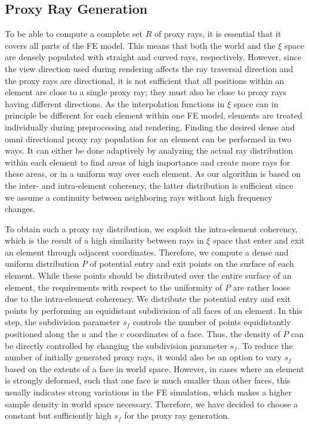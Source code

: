 \documentclass[journal]{vgtc}                %
\begin{document}
\subsection{Proxy Ray Generation}\label{subsec:proxyraygeneration}
To be able to compute a complete set $R$ of proxy rays, it is essential that it covers all parts of the FE model. This means that both the world and the $\xi$ space are densely populated with straight and curved rays, respectively. However, since the view direction used during rendering affects the ray traversal direction and the proxy rays are directional, it is not sufficient that all positions within an element are close to a single proxy ray; they must also be close to proxy rays having different directions. As the interpolation functions in $\xi$ space can in principle be different for each element within one FE model, elements are treated individually during preprocessing and rendering. Finding the desired dense and omni directional proxy ray population for an element can be performed in two ways. It can either be done adaptively by analyzing the actual ray distribution within each element to find areas of high importance and create more rays for these areas, or in a uniform way over each element. As our algorithm is based on the inter- and intra-element coherency, the latter distribution is sufficient since we assume a continuity between neighboring rays without high frequency changes.

To obtain such a proxy ray distribution, we exploit the intra-element coherency, which is the result of a high similarity between rays in $\xi$ space that enter and exit an element through adjacent coordinates. Therefore, we compute a dense and uniform distribution $P$ of potential entry and exit points on the surface of each element. While these points should be distributed over the entire surface of an element, the requirements with respect to the uniformity of $P$ are rather loose due to the intra-element coherency. We distribute the potential entry and exit points by performing an equidistant subdivision of all faces of an element. In this step, the subdivision parameter $s_f$ controls the number of points equidistantly positioned along the $u$ and the $v$ coordinates of a face. Thus, the density of $P$ can be directly controlled by changing the subdivision parameter $s_f$. To reduce the number of initially generated proxy rays, it would also be an option to vary $s_f$ based on the extents of a face in world space. However, in cases where an element is strongly deformed, such that one face is much smaller than other faces, this usually indicates strong variations in the FE simulation, which makes a higher sample density in world space necessary. Therefore, we have decided to choose a constant but sufficiently high $s_f$ for the proxy ray generation.
\end{document}
